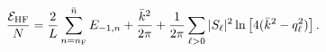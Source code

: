 \begin{equation}
\frac{{\cal E}_{\rm HF}}{N} =\frac{2}{L} \sum_{n=n_{\rm F}}^{\bar{n}} E_{-1,n} + \frac{\bar{k}^2}{2\pi}
+ \frac{1}{2\pi} \sum_{\ell >0} |S_{\ell}|^2 \ln \left[ 4(\bar{k}^2-q_{\ell}^2)\right]  .
\label{t12}
\end{equation}

